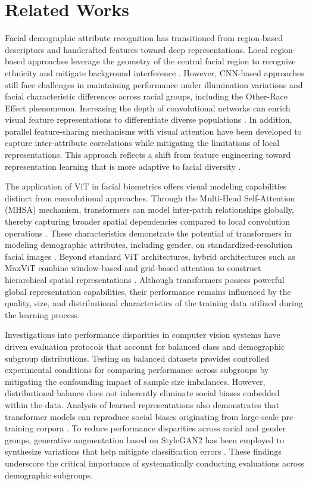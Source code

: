 \section{Related Works}
\label{sec:related_works}

Facial demographic attribute recognition has transitioned from region-based descriptors and handcrafted features toward deep representations. Local region-based approaches leverage the geometry of the central facial region to recognize ethnicity and mitigate background interference \cite{ref11}. However, CNN-based approaches still face challenges in maintaining performance under illumination variations and facial characteristic differences across racial groups, including the Other-Race Effect phenomenon. Increasing the depth of convolutional networks can enrich visual feature representations to differentiate diverse populations \cite{ref13}. In addition, parallel feature-sharing mechanisms with visual attention have been developed to capture inter-attribute correlations while mitigating the limitations of local representations. This approach reflects a shift from feature engineering toward representation learning that is more adaptive to facial diversity \cite{ref16}.

The application of ViT in facial biometrics offers visual modeling capabilities distinct from convolutional approaches. Through the Multi-Head Self-Attention (MHSA) mechanism, transformers can model inter-patch relationships globally, thereby capturing broader spatial dependencies compared to local convolution operations \cite{ref14}. These characteristics demonstrate the potential of transformers in modeling demographic attributes, including gender, on standardized-resolution facial images \cite{ref17}. Beyond standard ViT architectures, hybrid architectures such as MaxViT combine window-based and grid-based attention to construct hierarchical spatial representations \cite{ref18}. Although transformers possess powerful global representation capabilities, their performance remains influenced by the quality, size, and distributional characteristics of the training data utilized during the learning process.

Investigations into performance disparities in computer vision systems have driven evaluation protocols that account for balanced class and demographic subgroup distributions. Testing on balanced datasets provides controlled experimental conditions for comparing performance across subgroups by mitigating the confounding impact of sample size imbalances. However, distributional balance does not inherently eliminate social biases embedded within the data. Analysis of learned representations also demonstrates that transformer models can reproduce social biases originating from large-scale pre-training corpora \cite{ref14}. To reduce performance disparities across racial and gender groups, generative augmentation based on StyleGAN2 has been employed to synthesize variations that help mitigate classification errors \cite{ref15}. These findings underscore the critical importance of systematically conducting evaluations across demographic subgroups.

